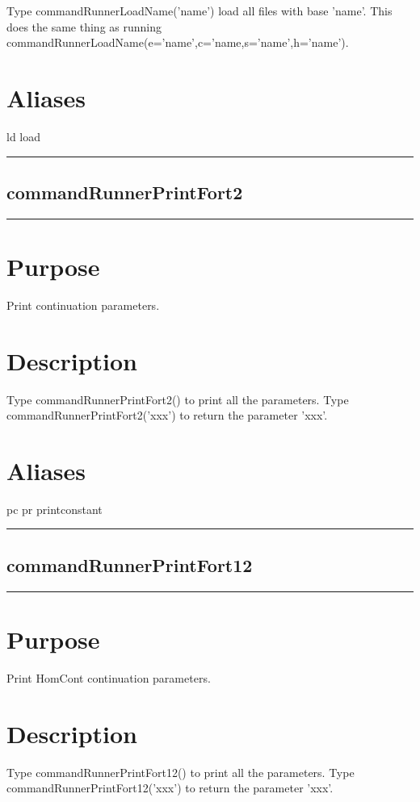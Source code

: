 \documentclass[12pt]{report}
\begin{document}
\begin{minipage}{6in}
    Type commandRunnerLoadName('name') load all files with base 'name'.
    This does the same thing as running
    commandRunnerLoadName(e='name',c='name,s='name',h='name').
    \section*{Aliases}
ld load \medskip\hrule\end{minipage}\subsection{commandRunnerPrintFort2} \label{sec:clui_ref_commandRunnerPrintFort2}\begin{minipage}{6in}\hrule\medskip\section*{Purpose}
Print continuation parameters.\section*{Description}

    Type commandRunnerPrintFort2() to print all the parameters.
    Type commandRunnerPrintFort2('xxx') to return the parameter 'xxx'.
    \section*{Aliases}
pc pr printconstant \medskip\hrule\end{minipage}\subsection{commandRunnerPrintFort12} \label{sec:clui_ref_commandRunnerPrintFort12}\begin{minipage}{6in}\hrule\medskip\section*{Purpose}
Print HomCont continuation parameters.\section*{Description}

    Type commandRunnerPrintFort12() to print all the parameters.
    Type commandRunnerPrintFort12('xxx') to return the parameter 'xxx'.

\end{minipage}
\end{document}
